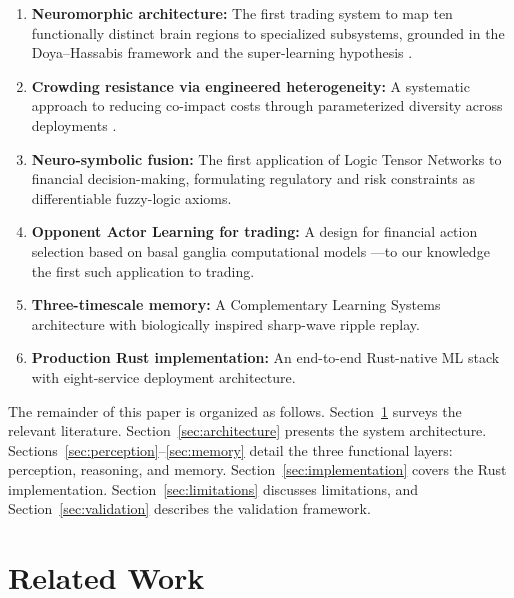 \documentclass[12pt, a4paper]{article}
\begin{document}
\begin{enumerate}
	\item \textbf{Neuromorphic architecture:} The first trading system to map ten functionally distinct brain regions to specialized subsystems, grounded in the Doya--Hassabis framework \citep{doya1999computations, hassabis2017neuroscience} and the super-learning hypothesis \citep{caligiore2019superlearning}.
	\item \textbf{Crowding resistance via engineered heterogeneity:} A systematic approach to reducing co-impact costs through parameterized diversity across deployments \citep{wagner2011diversity, demiguel2021crowding}.
	\item \textbf{Neuro-symbolic fusion:} The first application of Logic Tensor Networks \citep{badreddine2022logic} to financial decision-making, formulating regulatory and risk constraints as differentiable fuzzy-logic axioms.
	\item \textbf{Opponent Actor Learning for trading:} A design for financial action selection based on basal ganglia computational models \citep{collins2014opponent, jaskir2023opal}---to our knowledge the first such application to trading.
	\item \textbf{Three-timescale memory:} A Complementary Learning Systems architecture \citep{mcclelland1995complementary, kumaran2016cls} with biologically inspired sharp-wave ripple replay.
	\item \textbf{Production Rust implementation:} An end-to-end Rust-native ML stack with eight-service deployment architecture.
\end{enumerate}

The remainder of this paper is organized as follows. Section~\ref{sec:related_work} surveys the relevant literature. Section~\ref{sec:architecture} presents the system architecture. Sections~\ref{sec:perception}--\ref{sec:memory} detail the three functional layers: perception, reasoning, and memory. Section~\ref{sec:implementation} covers the Rust implementation. Section~\ref{sec:limitations} discusses limitations, and Section~\ref{sec:validation} describes the validation framework.

\section{Related Work}
\label{sec:related_work}
\end{document}
